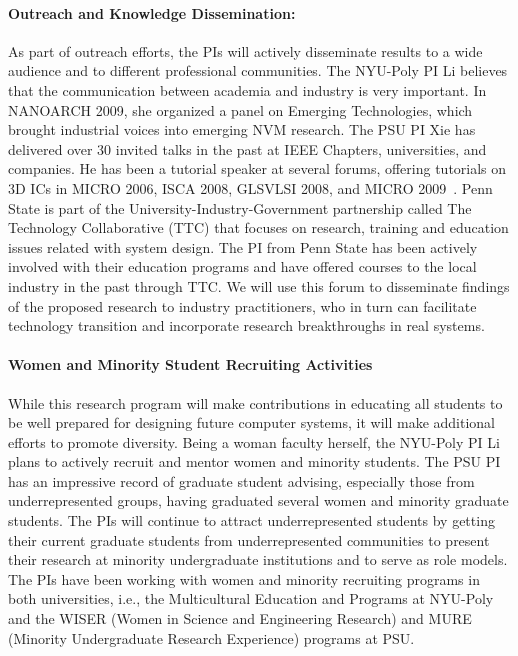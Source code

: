 \paragraph{\textbf{Outreach and Knowledge Dissemination:}} As part of outreach
efforts, the PIs will actively
disseminate results to a wide audience
and to different professional communities. The NYU-Poly PI Li believes that the communication between academia and industry
is very important. In NANOARCH 2009, she organized a panel on Emerging Technologies,
which brought industrial voices into emerging NVM research.
The PSU PI Xie has delivered over 30 invited talks in the
past at IEEE Chapters, universities, and companies.
He has been a tutorial speaker at several forums, offering
tutorials on 3D ICs in MICRO 2006, ISCA 2008, GLSVLSI 2008, and MICRO 2009~\cite{xie_url}.
Penn State is part of
the University-Industry-Government partnership called The
Technology Collaborative (TTC) that focuses on research, training
and education issues related with system design. The PI from Penn
State has been actively involved with their education programs and
have offered courses to the local industry in the past through
TTC. We will use this forum to disseminate findings of the
proposed research to industry practitioners, who in turn can
facilitate technology transition and incorporate research
breakthroughs in real systems.

\paragraph{\textbf{Women and Minority Student Recruiting Activities}}
While this research program will make contributions in educating all students to be well prepared for designing future computer systems, it will make additional efforts to promote diversity. Being a woman faculty herself, the NYU-Poly PI Li plans to actively recruit and mentor women and minority students. The PSU PI has an impressive record of graduate student advising, especially those from underrepresented groups, having graduated several women and minority graduate students. The PIs will continue to attract underrepresented students by getting their current graduate students from underrepresented communities to present their research at minority undergraduate institutions and to serve as role models. The PIs have been working with women and minority recruiting programs in both universities, i.e., the Multicultural Education and Programs at NYU-Poly and the WISER (Women in Science and Engineering Research) and MURE (Minority Undergraduate Research Experience) programs at PSU.



